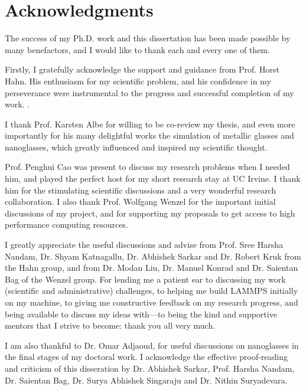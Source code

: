 \chapter{Acknowledgments} \label{c:ack}
The success of my Ph.D. work and this dissertation has been made possible by many benefactors, and I would like to thank each and every one of them. \par

Firstly, I gratefully acknowledge the support and guidance from Prof. Horst Hahn. His enthusiasm for my scientific problem, and his confidence in my perseverance were instrumental to the progress and successful completion of my work. . \par

I thank Prof. Karsten Albe for willing to be co-review my thesis, and even more importantly for his many delightful works the simulation of metallic glasses and nanoglasses, which greatly influenced and inspired my scientific thought. \par

Prof. Penghui Cao was present to discuss my research problems when I needed him, and played the perfect host for my short research stay at UC Irvine. I thank him for the stimulating scientific discussions and a very wonderful research collaboration. I also thank Prof. Wolfgang Wenzel for the important initial discussions of my project, and for supporting my proposals to get access to high performance computing resources. \par

I greatly appreciate the useful discussions and advise from Prof. Sree Harsha Nandam, Dr. Shyam Katnagallu, Dr. Abhishek Sarkar and Dr. Robert Kruk from the Hahn group, and from Dr. Modan Liu, Dr. Manuel Konrad and Dr. Saientan Bag of the Wenzel group. For lending me a patient ear to discussing my work (scientific and administrative) challenges, to helping me build LAMMPS initially on my machine, to giving me constructive feedback on my research progress, and being available to discuss my ideas with---to being the kind and supportive mentors that I strive to become: thank you all very much. \par

I am also thankful to Dr. Omar Adjaoud, for useful discussions on nanoglasses in the final stages of my doctoral work. I acknowledge the effective proof-reading and criticism of this disseration by Dr. Abhishek Sarkar, Prof. Harsha Nandam, Dr. Saientan Bag, Dr. Surya Abhishek Singaraju and Dr. Nithin Suryadevara. \par

